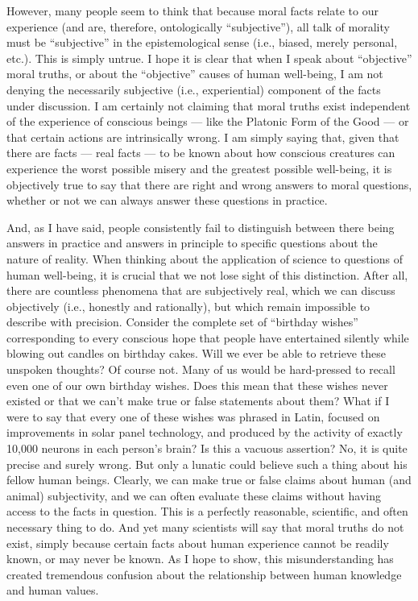 \documentclass[a4paper,14pt]{extbook}
\begin{document}
However, many people seem to think that because moral facts relate to our experience (and are, therefore, ontologically ``subjective''), all talk of morality must be ``subjective'' in the epistemological sense (i.e., biased, merely personal, etc.).
This is simply untrue.
I hope it is clear that when I speak about ``objective'' moral truths, or about the ``objective'' causes of human well-being, I am not denying the necessarily subjective (i.e., experiential) component of the facts under discussion.
I am certainly not claiming that moral truths exist independent of the experience of conscious beings --- like the Platonic Form of the Good --- or that certain actions are intrinsically wrong.
I am simply saying that, given that there are facts --- real facts --- to be known about how conscious creatures can experience the worst possible misery and the greatest possible well-being, it is objectively true to say that there are right and wrong answers to moral questions, whether or not we can always answer these questions in practice.

And, as I have said, people consistently fail to distinguish between there being answers in practice and answers in principle to specific questions about the nature of reality.
When thinking about the application of science to questions of human well-being, it is crucial that we not lose sight of this distinction.
After all, there are countless phenomena that are subjectively real, which we can discuss objectively (i.e., honestly and rationally), but which remain impossible to describe with precision.
Consider the complete set of ``birthday wishes'' corresponding to every conscious hope that people have entertained silently while blowing out candles on birthday cakes.
Will we ever be able to retrieve these unspoken thoughts?
Of course not.
Many of us would be hard-pressed to recall even one of our own birthday wishes.
Does this mean that these wishes never existed or that we can't make true or false statements about them?
What if I were to say that every one of these wishes was phrased in Latin, focused on improvements in solar panel technology, and produced by the activity of exactly 10,000 neurons in each person's brain?
Is this a vacuous assertion?
No, it is quite precise and surely wrong.
But only a lunatic could believe such a thing about his fellow human beings.
Clearly, we can make true or false claims about human (and animal) subjectivity, and we can often evaluate these claims without having access to the facts in question.
This is a perfectly reasonable, scientific, and often necessary thing to do.
And yet many scientists will say that moral truths do not exist, simply because certain facts about human experience cannot be readily known, or may never be known.
As I hope to show, this misunderstanding has created tremendous confusion about the relationship between human knowledge and human values.
\end{document}
